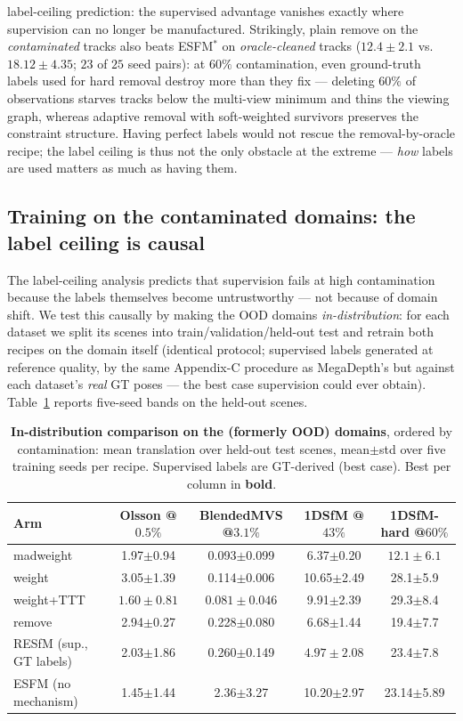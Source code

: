 \documentclass{article}
\newcommand{\mad}{madweight}
\begin{document}
label-ceiling prediction: the supervised advantage vanishes exactly where supervision can
no longer be manufactured. Strikingly, plain remove on the \emph{contaminated} tracks also beats
ESFM$^{\ast}$ on \emph{oracle-cleaned} tracks ($12.4\pm2.1$ vs.\ $18.12\pm4.35$;
$23$ of $25$ seed pairs): at $60\%$ contamination, even ground-truth labels used for
hard removal destroy more than they fix --- deleting $60\%$ of observations starves
tracks below the multi-view minimum and thins the viewing graph, whereas adaptive
removal with soft-weighted survivors preserves the constraint structure. Having
perfect labels would not rescue the removal-by-oracle recipe; the label ceiling is
thus not the only obstacle at the extreme --- \emph{how} labels are used matters as
much as having them.




\subsection{Training on the contaminated domains: the label ceiling is causal}\label{sec:indist}
The label-ceiling analysis predicts that supervision fails at high contamination because
the labels themselves become untrustworthy --- not because of domain shift. We test this
causally by making the OOD domains \emph{in-distribution}: for each dataset we split its
scenes into train/validation/held-out test and retrain both recipes on the domain itself
(identical protocol; supervised labels generated at reference quality, by the same
Appendix-C procedure as MegaDepth's but against each dataset's \emph{real} GT poses ---
the best case supervision could ever obtain). Table~\ref{tab:indist} reports five-seed
bands on the held-out scenes.

\begin{table}[t]\centering\footnotesize
\caption{\textbf{In-distribution comparison on the (formerly OOD) domains}, ordered by
contamination: mean translation over held-out test scenes, mean$\pm$std over five
training seeds per recipe. Supervised labels are GT-derived (best case). Best per
column in \textbf{bold}.}
\label{tab:indist}
\setlength{\tabcolsep}{5pt}%
\begin{tabular}{lcccc}
\toprule
Arm & Olsson @$0.5\%$ & BlendedMVS @$3.1\%$ & 1DSfM @$43\%$ & 1DSfM-hard @$60\%$\\
\midrule
\mad{}      & 1.97$\pm$0.94 & 0.093$\pm$0.099 & 6.37$\pm$0.20 & $\mathbf{12.1\pm 6.1}$\\
weight      & 3.05$\pm$1.39 & 0.114$\pm$0.006 & 10.65$\pm$2.49 & 28.1$\pm$5.9\\
weight+TTT  & $\mathbf{1.60\pm 0.81}$ & $\mathbf{0.081\pm 0.046}$ & 9.91$\pm$2.39 & 29.3$\pm$8.4\\
remove      & 2.94$\pm$0.27 & 0.228$\pm$0.080 & 6.68$\pm$1.44 & 19.4$\pm$7.7\\
RESfM (sup., GT labels) & 2.03$\pm$1.86 & 0.260$\pm$0.149 & $\mathbf{4.97\pm 2.08}$ & 23.4$\pm$7.8\\
ESFM (no mechanism) & 1.45$\pm$1.44 & 2.36$\pm$3.27 & 10.20$\pm$2.97 & 23.14$\pm$5.89\\
\bottomrule
\end{tabular}
\end{table}
\end{document}
